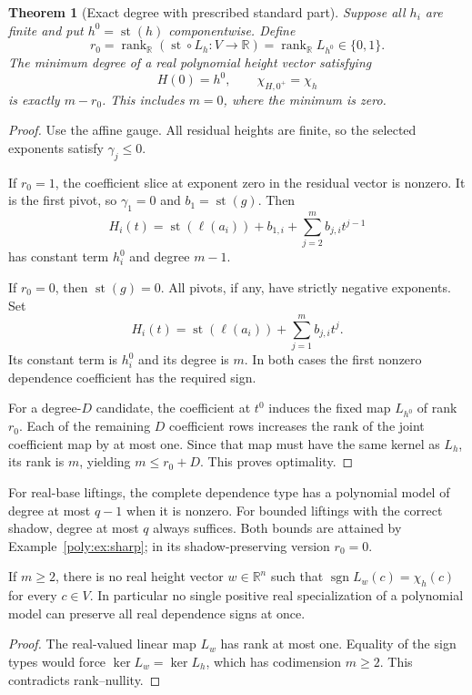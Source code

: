 \documentclass[11pt,a4paper]{article}
\numberwithin{equation}{section}
\newtheorem{theorem}{Theorem}[section]
\theoremstyle{plain}
\newcommand{\R}{\mathbb R}
\newcommand{\st}{\operatorname{st}}
\newcommand{\sgn}{\operatorname{sgn}}
\newcommand{\rank}{\operatorname{rank}}
\begin{document}
\begin{theorem}[Exact degree with prescribed standard part]\label{poly:thm:shadowdegree}
Suppose all $h_i$ are finite and put $h^0=\st(h)$ componentwise. Define
\[
 r_0=\rank_{\R}(\st\circ L_h:V\to\R)
     =\rank_{\R}L_{h^0}\in\{0,1\}.
\]
The minimum degree of a real polynomial height vector satisfying
\[
 H(0)=h^0,\qquad \chi_{H,0^+}=\chi_h
\]
is exactly $m-r_0$. This includes $m=0$, where the minimum is zero.
\end{theorem}
\begin{proof}
Use the affine gauge. All residual heights are finite, so the selected
exponents satisfy $\gamma_j\le0$.

If $r_0=1$, the coefficient slice at exponent zero in the residual vector
is nonzero. It is the first pivot, so $\gamma_1=0$ and
$b_1=\st(g)$. Then
\[
 H_i(t)=\st(\ell(a_i))+b_{1,i}
          +\sum_{j=2}^m b_{j,i}t^{j-1}
\]
has constant term $h_i^0$ and degree $m-1$.

If $r_0=0$, then $\st(g)=0$. All pivots, if any, have strictly negative
exponents. Set
\[
 H_i(t)=\st(\ell(a_i))+\sum_{j=1}^m b_{j,i}t^j.
\]
Its constant term is $h_i^0$ and its degree is $m$. In both cases the first
nonzero dependence coefficient has the required sign.

For a degree-$D$ candidate, the coefficient at $t^0$ induces the fixed
map $L_{h^0}$ of rank $r_0$. Each of the remaining $D$ coefficient rows
increases the rank of the joint coefficient map by at most one. Since
that map must have the same kernel as $L_h$, its rank is $m$, yielding
$m\le r_0+D$. This proves optimality.
\end{proof}

\begin{corollary}\label{poly:cor:uniform}
For real-base liftings, the complete dependence type has a polynomial
model of degree at most $q-1$ when it is nonzero. For bounded liftings
with the correct shadow, degree at most $q$ always suffices. Both bounds
are attained by Example~\ref{poly:ex:sharp}; in its shadow-preserving version
$r_0=0$.
\end{corollary}

\begin{proposition}
\label{poly:prop:nonuniform}
If $m\ge2$, there is no real height vector $w\in\R^n$ such that
$\sgn L_w(c)=\chi_h(c)$ for every $c\in V$. In particular no single
positive real specialization of a polynomial model can preserve all
real dependence signs at once.
\end{proposition}
\begin{proof}
The real-valued linear map $L_w$ has rank at most one. Equality of the
sign types would force $\ker L_w=\ker L_h$, which has codimension
$m\ge2$. This contradicts rank--nullity.
\end{proof}
\end{document}
